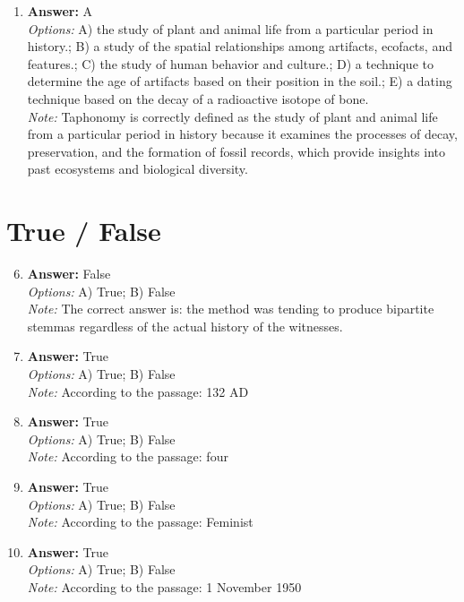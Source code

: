 \documentclass[12pt]{article}
\begin{document}
\begin{enumerate}[label=\arabic*.]
\\ \textit{Note:} Most archaeologists agree that the occupation of Australia began soon after 60,000 years ago due to evidence from archaeological sites, such as artifacts and human remains, that indicate the presence of early human inhabitants during this time frame.
\item \textbf{Answer:} A
\\ \textit{Options:} A) the study of plant and animal life from a particular period in history.; B) a study of the spatial relationships among artifacts, ecofacts, and features.; C) the study of human behavior and culture.; D) a technique to determine the age of artifacts based on their position in the soil.; E) a dating technique based on the decay of a radioactive isotope of bone.
\\ \textit{Note:} Taphonomy is correctly defined as the study of plant and animal life from a particular period in history because it examines the processes of decay, preservation, and the formation of fossil records, which provide insights into past ecosystems and biological diversity.
\end{enumerate}

\section*{True / False}
\begin{enumerate}[label=\arabic*.]
\setcounter{enumi}{5}
\item \textbf{Answer:} False
\\ \textit{Options:} A) True; B) False
\\ \textit{Note:} The correct answer is: the method was tending to produce bipartite stemmas regardless of the actual history of the witnesses.
\item \textbf{Answer:} True
\\ \textit{Options:} A) True; B) False
\\ \textit{Note:} According to the passage: 132 AD
\item \textbf{Answer:} True
\\ \textit{Options:} A) True; B) False
\\ \textit{Note:} According to the passage: four
\item \textbf{Answer:} True
\\ \textit{Options:} A) True; B) False
\\ \textit{Note:} According to the passage: Feminist
\item \textbf{Answer:} True
\\ \textit{Options:} A) True; B) False
\\ \textit{Note:} According to the passage: 1 November 1950
\end{enumerate}
\end{document}

